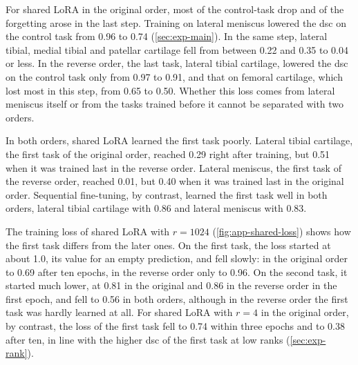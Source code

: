 For shared LoRA in the original order, most of the control-task drop and of the forgetting arose in the last step.
Training on lateral meniscus lowered the \gls{dsc} on the control task from 0.96 to 0.74 (\cref{sec:exp-main}).
In the same step, lateral tibial, medial tibial and patellar cartilage fell from between 0.22 and 0.35 to 0.04 or less.
In the reverse order, the last task, lateral tibial cartilage, lowered the \gls{dsc} on the control task only from 0.97 to 0.91, and that on femoral cartilage, which lost most in this step, from 0.65 to 0.50.
Whether this loss comes from lateral meniscus itself or from the tasks trained before it cannot be separated with two orders.

In both orders, shared LoRA learned the first task poorly.
Lateral tibial cartilage, the first task of the original order, reached 0.29 right after training, but 0.51 when it was trained last in the reverse order.
Lateral meniscus, the first task of the reverse order, reached 0.01, but 0.40 when it was trained last in the original order.
Sequential fine-tuning, by contrast, learned the first task well in both orders, lateral tibial cartilage with 0.86 and lateral meniscus with 0.83.

The training loss of shared LoRA with $r = 1024$ (\cref{fig:app-shared-loss}) shows how the first task differs from the later ones.
On the first task, the loss started at about 1.0, its value for an empty prediction, and fell slowly: in the original order to 0.69 after ten epochs, in the reverse order only to 0.96.
On the second task, it started much lower, at 0.81 in the original and 0.86 in the reverse order in the first epoch, and fell to 0.56 in both orders, although in the reverse order the first task was hardly learned at all.
For shared LoRA with $r = 4$ in the original order, by contrast, the loss of the first task fell to 0.74 within three epochs and to 0.38 after ten, in line with the higher \gls{dsc} of the first task at low ranks (\cref{sec:exp-rank}).


